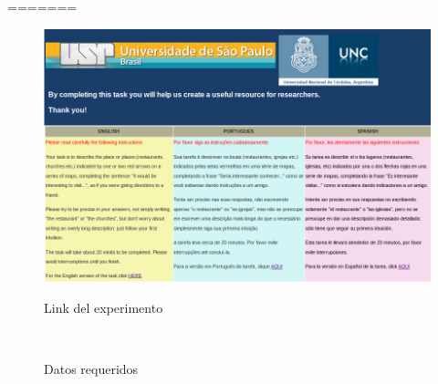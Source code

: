 %
%

=======
\begin{figure}[ht]
\begin{center}
\includegraphics[width=13cm]{images/pagPrincipal.png}\\[0pt]
\caption{Link del experimento}
\label{fig-pagPrincipal}
\end{center}
\end{figure}

\begin{figure}[ht]
\begin{center}
\\[0pt]
\caption{Datos requeridos}
\label{fig-nacionalidadGenero}
\end{center}
\end{figure}

